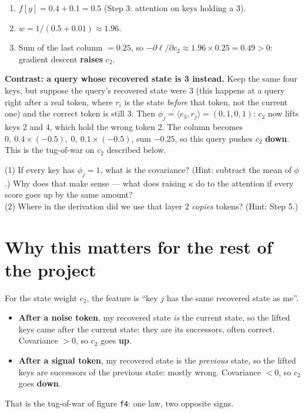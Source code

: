 \documentclass[11pt]{article}
\newcommand{\1}{\mathbf{1}}
\begin{document}
\begin{enumerate}
\item $f[y]=0.4+0.1=0.5$ (Step 3: attention on keys holding a 3).
\item $w=1/(0.5+0.01)\approx1.96$.
\item Sum of the last column $=0.25$, so $-\partial\ell/\partial c_2\approx1.96\times0.25=0.49>0$: gradient descent \textbf{raises} $c_2$.
\end{enumerate}
\textbf{Contrast: a query whose recovered state is 3 instead.} Keep the same four keys, but suppose the query's
recovered state were $3$ (this happens at a query right after a real token, where $r_i$ is the state \emph{before}
that token, not the current one) and the correct token is still $3$. Then $\phi_j=\langle e_3,r_j\rangle=(0,1,0,1)$:
$c_2$ now lifts keys 2 and 4, which hold the wrong token 2. The column becomes $0,\ 0.4\times(-0.5),\ 0,\ 0.1\times(-0.5)$,
sum $-0.25$, so this query pushes $c_2$ \textbf{down}. This is the tug-of-war on $c_2$ described below.

\begin{quickcheck}
(1) If every key has $\phi_j=1$, what is the covariance? (Hint: subtract the mean of $\phi$.) Why does that
make sense --- what does raising $\kappa$ do to the attention if every score goes up by the same amount?\\
(2) Where in the derivation did we use that layer 2 \emph{copies} tokens? (Hint: Step 5.)
\end{quickcheck}

\section{Why this matters for the rest of the project}
For the state weight $c_2$, the feature is ``key $j$ has the same recovered state as me''.
\begin{itemize}
\item \textbf{After a noise token}, my recovered state \emph{is} the current state, so the lifted keys came after
the current state: they are its successors, often correct. Covariance $>0$, so $c_2$ goes \textbf{up}.
\item \textbf{After a signal token}, my recovered state is the \emph{previous} state, so the lifted keys are
successors of the previous state: mostly wrong. Covariance $<0$, so $c_2$ goes \textbf{down}.
\end{itemize}
That is the tug-of-war of figure \texttt{f4}: one law, two opposite signs.
\end{document}
